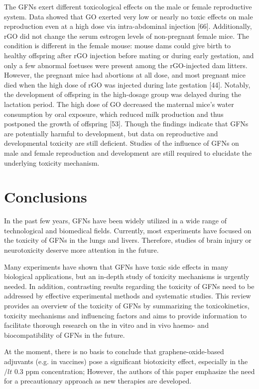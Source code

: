 \documentclass[twoside,twocolumn,9pt]{article}
\begin{document}
The GFNs exert different toxicological effects on the male or female reproductive system. Data showed that GO exerted very low or nearly no toxic effects on male reproduction even at a high dose via intra-abdominal injection [66]. Additionally, rGO did not change the serum estrogen levels of non-pregnant female mice. The condition is different in the female mouse: mouse dams could give birth to healthy offspring after rGO injection before mating or during early gestation, and only a few abnormal foetuses were present among the rGO-injected dam litters. However, the pregnant mice had abortions at all dose, and most pregnant mice died when the high dose of rGO was injected during late gestation [44]. Notably, the development of offspring in the high-dosage group was delayed during the lactation period. The high dose of GO decreased the maternal mice’s water consumption by oral exposure, which reduced milk production and thus postponed the growth of offspring [53]. Though the findings indicate that GFNs are potentially harmful to development, but data on reproductive and developmental toxicity are still deficient. Studies of the influence of GFNs on male and female reproduction and development are still required to elucidate the underlying toxicity mechanism.

\section{Conclusions}
In the past few years, GFNs have been widely utilized in a wide range of technological and biomedical fields. Currently, most experiments have focused on the toxicity of GFNs in the lungs and livers. Therefore, studies of brain injury or neurotoxicity deserve more attention in the future. 

Many experiments have shown that GFNs have toxic side effects in many biological applications, but an in-depth study of toxicity mechanisms is urgently needed. In addition, contrasting results regarding the toxicity of GFNs need to be addressed by effective experimental methods and systematic studies. This review provides an overview of the toxicity of GFNs by summarizing the toxicokinetics, toxicity mechanisms and influencing factors and aims to provide information to facilitate thorough research on the in vitro and in vivo haemo- and biocompatibility of GFNs in the future. 

At the moment, there is no basis to conclude that graphene-oxide-based adjuvants (e.g. in vaccines) pose a significant biotoxicity effect, especially in the $/lt$ 0.3 ppm concentration; However, the authors of this paper emphasize the need for a precautionary approach as new therapies are developed.
\end{document}
